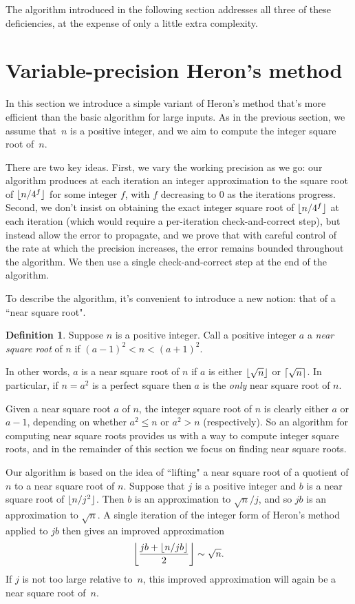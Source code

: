 \documentclass[a4paper]{article}
\DeclarePairedDelimiter\floor{\lfloor}{\rfloor}
\DeclarePairedDelimiter\ceil{\lceil}{\rceil}
\theoremstyle{plain}
\theoremstyle{definition}
\newtheorem{definition}[theorem]{Definition}
\begin{document}
The algorithm introduced in the following section addresses all three of these
deficiencies, at the expense of only a little extra complexity.

\section{Variable-precision Heron's method}
\label{new_method}

In this section we introduce a simple variant of Heron's method that's
more efficient than the basic algorithm for large inputs. As in
the previous section, we assume that~$n$ is a positive integer, and we aim to
compute the integer square root of~$n$.

There are two key ideas. First, we vary the working precision as we go: our
algorithm produces at each iteration an integer approximation to the square
root of $\floor{n/4^f}$ for some integer $f$, with $f$ decreasing to $0$ as the
iterations progress. Second, we don't insist on obtaining the exact integer
square root of $\floor{n/4^f}$ at each iteration (which would require a
per-iteration check-and-correct step), but instead allow the error to
propagate, and we prove that with careful control of the rate at which the
precision increases, the error remains bounded throughout the algorithm. We
then use a single check-and-correct step at the end of the algorithm.

To describe the algorithm, it's convenient to introduce a new notion: that of a
``near square root".

\begin{definition}
  Suppose $n$ is a positive integer. Call a positive integer $a$ a
  \emph{near square root} of $n$ if $(a - 1)^2 < n < (a + 1)^2$.
\end{definition}

In other words, $a$ is a near square root of $n$ if $a$ is either $\floor{\sqrt
n}$ or $\ceil{\sqrt n}$. In particular, if $n = a^2$ is a perfect square then
$a$ is the \emph{only} near square root of $n$.

Given a near square root $a$ of $n$, the integer square root of $n$ is clearly
either $a$ or $a-1$, depending on whether $a^2 \le n$ or $a^2 > n$
(respectively). So an algorithm for computing near square roots provides us
with a way to compute integer square roots, and in the remainder of this
section we focus on finding near square roots.

Our algorithm is based on the idea of ``lifting" a near square root of a
quotient of $n$ to a near square root of $n$. Suppose that $j$ is a positive
integer and $b$ is a near square root of $\floor{n / j^2}$. Then $b$ is an
approximation to $\sqrt n / j$, and so $jb$ is an approximation to $\sqrt n$. A
single iteration of the integer form of Heron's method applied to $jb$ then
gives an improved approximation
$$\floor*{\frac{jb + \floor{n / jb}}2} \sim \sqrt n.$$
If $j$ is not too large relative to~$n$, this
improved approximation will again be a near square root of~$n$.
\end{document}
